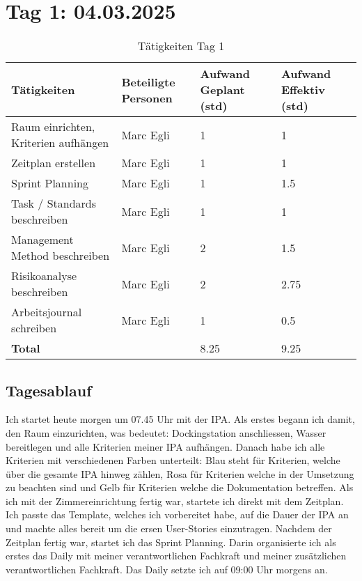 \section{Tag 1: 04.03.2025}
\begin{table}[H]
    \begin{tabular}{|L{0.4\textwidth}|C{60pt}|C{60pt}|C{60pt}|}
        \hline
        \color{white}Tätigkeiten & \color{white}Beteiligte \color{white}Personen & \color{white}Aufwand Geplant (std) & \color{white}Aufwand Effektiv (std) \\
        \hline
         Raum einrichten, Kriterien aufhängen & Marc Egli & 1 & 1 \\
        \hline
        Zeitplan erstellen & Marc Egli & 1 & 1 \\
        \hline
        Sprint Planning & Marc Egli & 1 & 1.5 \\
        \hline
        Task / Standards beschreiben & Marc Egli & 1 & 1 \\
        \hline
        Management Method beschreiben & Marc Egli & 2 & 1.5 \\
        \hline
        Risikoanalyse beschreiben & Marc Egli & 2 & 2.75 \\
        \hline
        Arbeitsjournal schreiben & Marc Egli & 1 & 0.5 \\
        \hline
        \textbf{Total} &  & 8.25 & 9.25 \\
        \hline
    \end{tabular}
    \caption{Tätigkeiten Tag 1}
\end{table}

\subsection*{Tagesablauf}
Ich startet heute morgen um 07.45 Uhr mit der IPA. Als erstes begann ich damit, den Raum einzurichten, was bedeutet: 
Dockingstation anschliessen, Wasser bereitlegen und alle Kriterien meiner IPA aufhängen. Danach habe ich alle Kriterien mit verschiedenen
Farben unterteilt: Blau steht für Kriterien, welche über die gesamte IPA hinweg zählen, Rosa für Kriterien welche in der Umsetzung zu beachten sind und 
Gelb für Kriterien welche die Dokumentation betreffen. Als ich mit der Zimmereinrichtung fertig war, startete ich direkt mit dem Zeitplan. Ich passte das Template,
welches ich vorbereitet habe, auf die Dauer der IPA an und machte alles bereit um die ersen User-Stories einzutragen.  Nachdem der Zeitplan fertig war, startet ich das Sprint Planning.
Darin organisierte ich als erstes das Daily mit meiner verantwortlichen Fachkraft und meiner zusätzlichen verantwortlichen Fachkraft. Das Daily setzte ich auf
09:00 Uhr morgens an. 

